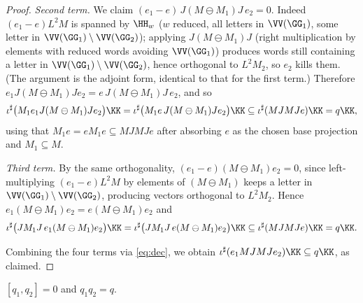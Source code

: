 \begin{proof}
\medskip
\emph{Second term.} We claim $(e_1-e)\,J(M\ominus M_1)J\,e_2=0$. Indeed
$(e_1-e)L^2M$ is spanned by $\HH_w$ ($w$ reduced, all letters in $\VV(\GG_1)$, some letter
in $\VV(\GG_1)\setminus\VV(\GG_2)$); applying $J(M\ominus M_1)J$ (right multiplication by
elements with reduced words avoiding $\VV(\GG_1)$) produces words still containing a letter
in $\VV(\GG_1)\setminus\VV(\GG_2)$, hence orthogonal to $L^2M_2$, so $e_2$ kills them. (The
argument is the adjoint form, identical to that for the first term.) Therefore
$e_1 J(M\ominus M_1)J e_2=e\,J(M\ominus M_1)J\,e_2$, and so
\[
\iota^\sharp\big(M_1 e_1 J(M\ominus M_1)J e_2\big)\KK
=\iota^\sharp\big(M_1 e\, J(M\ominus M_1)J e_2\big)\KK
\subseteq\iota^\sharp(MJMJe)\KK=q\KK,
\]
using that $M_1 e=e M_1 e\subseteq MJMJe$ after absorbing $e$ as the chosen base projection
and $M_1\subseteq M$.

\medskip
\emph{Third term.} By the same orthogonality, $(e_1-e)(M\ominus M_1)e_2=0$, since
left-multiplying $(e_1-e)L^2M$ by elements of $(M\ominus M_1)$ keeps a letter in
$\VV(\GG_1)\setminus\VV(\GG_2)$, producing vectors orthogonal to $L^2M_2$. Hence
$e_1(M\ominus M_1)e_2=e(M\ominus M_1)e_2$ and
\[
\iota^\sharp\big(JM_1J\,e_1(M\ominus M_1)e_2\big)\KK
=\iota^\sharp\big(JM_1J\,e(M\ominus M_1)e_2\big)\KK
\subseteq\iota^\sharp(MJMJe)\KK=q\KK .
\]

Combining the four terms via \eqref{eq:dec}, we obtain
$\iota^\sharp(e_1 MJMJ e_2)\KK\subseteq q\KK$, as claimed.
\end{proof}

\begin{corollary}\label{cor:comm}
$[q_1,q_2]=0$ and $q_1q_2=q$.
\end{corollary}

